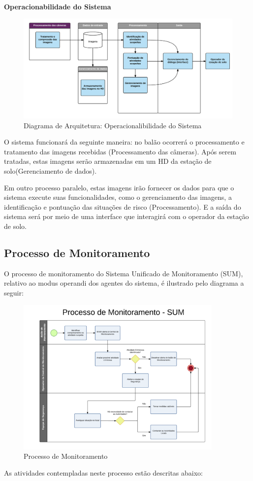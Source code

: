 \textbf{Operacionabilidade do Sistema}

\begin{figure}[H]
	\centering
	\includegraphics[width=1\textwidth]{figuras/OperacionabilidadedoSistema}
	\caption{Diagrama de Arquitetura: Operacionalibilidade do Sistema}
	\label{img:Operacionabilidade do Sistema}
\end{figure}

O sistema funcionará da seguinte maneira: no balão ocorrerá o processamento e tratamento das imagens recebidas (Processamento das câmeras). Após serem tratadas, estas imagens serão armazenadas em um HD da estação de solo(Gerenciamento de dados).

Em outro processo paralelo, estas imagens  irão fornecer os dados para que o sistema execute suas funcionalidades, como o gerenciamento das imagens, a identificação e pontuação das situações de risco (Processamento). E a saída do sistema será por meio de uma interface que interagirá com o operador da estação de solo.

\subsection{Processo de Monitoramento}
O processo de monitoramento do Sistema Unificado de Monitoramento (SUM), relativo ao modus operandi dos agentes do sistema, é ilustrado pelo diagrama a seguir:

\begin{figure}[H]
\centering
\includegraphics[width=0.9\textwidth]{figuras/Processodemonitorament}
\caption{Processo de Monitoramento}
\label{img:Processo de Monitoramento}
\end{figure}
As atividades contempladas neste processo estão descritas abaixo:
\\

